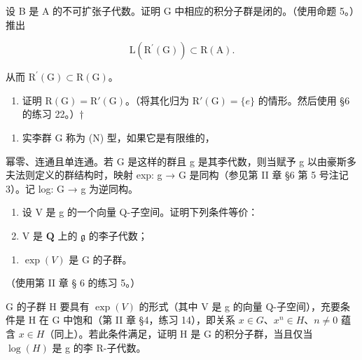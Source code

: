设 B 是 A 的不可扩张子代数。证明 G 中相应的积分子群是闭的。（使用命题 5。）推出

\[
\mathrm{L} (\mathrm{R} ^ {\prime} (\mathrm{G})) \subset \mathrm{R} (\mathrm{A}).
\]

从而 \(\mathrm{R}^{\prime}(\mathrm{G})\subset\mathrm{R}(\mathrm{G})\)。

\begin{enumerate}
\def\labelenumi{(\alph{enumi})}
\setcounter{enumi}{13}
\tightlist
\item
  证明 \(\mathrm{R}(\mathrm{G}) = \mathrm{R}'(\mathrm{G})\)。（将其化归为 \(\mathrm{R}'(\mathrm{G}) = \{e\}\) 的情形。然后使用 §6 的练习 22。）†
\end{enumerate}

\begin{enumerate}
\def\labelenumi{\arabic{enumi}.}
\setcounter{enumi}{28}
\tightlist
\item
  实李群 G 称为 (N) 型，如果它是有限维的，
\end{enumerate}

幂零、连通且单连通。若 G 是这样的群且 g 是其李代数，则当赋予 g 以由豪斯多夫法则定义的群结构时，映射 exp: g → G 是同构（参见第 II 章 §6 第 5 号注记 3）。记 log: G → g 为逆同构。

\begin{enumerate}
\def\labelenumi{(\alph{enumi})}
\item
  设 V 是 g 的一个向量 Q-子空间。证明下列条件等价：
\item
  V 是 \(\mathbf{Q}\) 上的 \(\mathfrak{g}\) 的李子代数；
\end{enumerate}

\begin{enumerate}
\def\labelenumi{(\roman{enumi})}
\setcounter{enumi}{1}
\tightlist
\item
  \(\exp(V)\) 是 G 的子群。
\end{enumerate}

（使用第 II 章 § 6 的练习 5。）

G 的子群 H 要具有 \(\exp(V)\) 的形式（其中 V 是 g 的向量 Q-子空间），充要条件是 H 在 G 中饱和（第 II 章 §4，练习 14），即关系 \(x \in G\)、\(x^{n} \in H\)、\(n \neq 0\) 蕴含 \(x \in H\)（同上）。若此条件满足，证明 H 是 G 的积分子群，当且仅当 \(\log(H)\) 是 g 的李 R-子代数。


